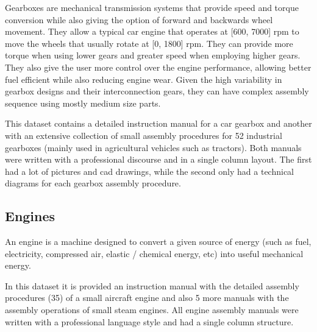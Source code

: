 Gearboxes are mechanical transmission systems that provide speed and torque conversion while also giving the option of forward and backwards wheel movement. They allow a typical car engine that operates at [600, 7000] \gls{rpm} to move the wheels that usually rotate at [0, 1800] \gls{rpm}. They can provide more torque when using lower gears and greater speed when employing higher gears. They also give the user more control over the engine performance, allowing better fuel efficient while also reducing engine wear. Given the high variability in gearbox designs and their interconnection gears, they can have complex assembly sequence using mostly medium size parts.

This dataset contains a detailed instruction manual for a car gearbox and another with an extensive collection of small assembly procedures for 52 industrial gearboxes (mainly used in agricultural vehicles such as tractors). Both manuals were written with a professional discourse and in a single column layout. The first had a lot of pictures and \gls{cad} drawings, while the second only had a technical diagrams for each gearbox assembly procedure.


\subsection{Engines}

An engine is a machine designed to convert a given source of energy (such as fuel, electricity, compressed air, elastic / chemical energy, etc) into useful mechanical energy.

In this dataset it is provided an instruction manual with the detailed assembly procedures (35) of a small aircraft engine and also 5 more manuals with the assembly operations of small steam engines. All engine assembly manuals were written with a professional language style and had a single column structure.


